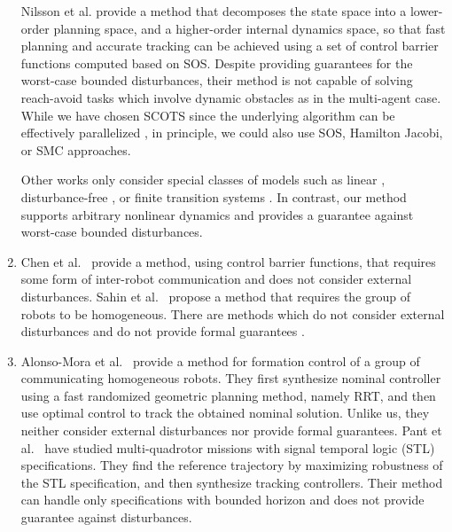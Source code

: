 \begin{enumerate}[(1)]
Nilsson et al. \cite{Nilsson:2018} provide a method that decomposes the state space into a lower-order planning space, and a higher-order internal dynamics space, so that fast planning and accurate tracking can be achieved using a set of control barrier functions computed based on SOS. Despite providing guarantees for the worst-case bounded disturbances, their method is not capable of solving reach-avoid tasks which involve dynamic obstacles as in the multi-agent case.
While we have chosen SCOTS since the underlying algorithm can be effectively parallelized \cite{KhaledZ19pfaces}, in principle, we could
also use SOS, Hamilton Jacobi, or SMC approaches. %

Other works only consider special classes of models such as linear \cite{fan2018controller,wongpiromsarn2012receding,Rodionova2020LearningtoFlyLC}, 
disturbance-free \cite{tedrake2010lqr,fan2020fast,Srinivasan2018}, or finite transition systems \cite{Yang2017milp}. 
In contrast, our method supports arbitrary 
 nonlinear dynamics and provides a guarantee 
against worst-case bounded disturbances.
	\item Chen et al.\ \cite{Chen2018cbf} provide a method, using control barrier functions, that requires some form of inter-robot 
communication and does not consider external disturbances.
Sahin et al.\ \cite{Shahin2017cltl} propose a method that requires the group of robots to be homogeneous.
There are methods which do not consider external disturbances and do not provide formal guarantees \cite{jackson2020scalable}.
	\item Alonso-Mora et al.\ \cite{alonso2019distributed} provide a method for formation control of a group of communicating homogeneous robots.
They first synthesize nominal controller using a fast randomized geometric planning method, namely RRT, and 
then use optimal control to track the obtained nominal solution.
Unlike us, they neither consider external disturbances nor provide formal guarantees. Pant et al.\ \cite{Pant2018multiquad} have studied multi-quadrotor missions with signal temporal logic (STL) specifications. They find the reference trajectory by maximizing robustness of the STL specification, and then synthesize tracking controllers. Their method can handle only specifications with bounded horizon and does not provide guarantee against disturbances.


\end{enumerate}
